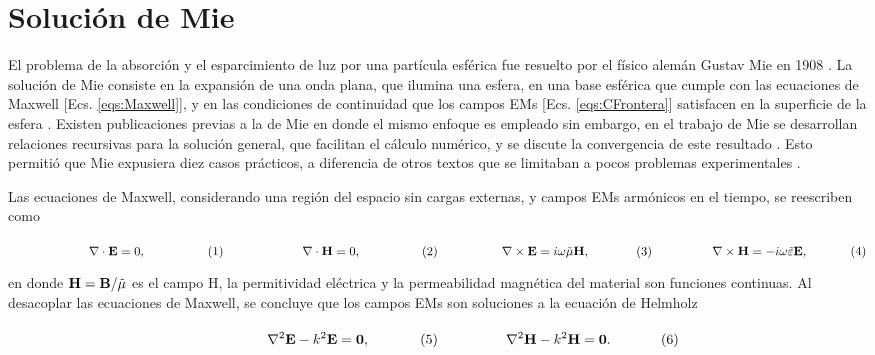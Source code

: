 \section{Solución de Mie}

El problema de la absorción y el esparcimiento de luz por una partícula esférica fue resuelto por el físico alemán Gustav Mie en 1908 \cite{mie1908metallosung}. La solución de Mie consiste en la expansión de una onda plana, que ilumina una esfera, en una base esférica que cumple con las ecuaciones de Maxwell [Ecs. \eqref{eqs:Maxwell}],  y en las condiciones de continuidad que los campos EMs [Ecs. \eqref{eqs:CFrontera}] satisfacen en la superficie de la esfera \cite{bohren1998absorption,mie1908metallosung,horvath2009historic}. Existen publicaciones previas a la de Mie en donde el mismo enfoque es empleado \cite{horvath2009historic} sin embargo, en el trabajo de Mie se  desarrollan relaciones recursivas para la solución general, que facilitan el cálculo numérico, y se discute la convergencia de este resultado \cite{horvath2009historic}. Esto permitió que Mie expusiera diez casos prácticos, a diferencia de otros textos que se limitaban a pocos problemas experimentales \cite{horvath2009historic}.

Las ecuaciones de Maxwell, considerando una región del espacio sin cargas externas, y campos EMs armónicos en el tiempo, se reescriben como

	\begin{subequations}
	\eqhalf{\nabla\cdot \vb{E} = 0, }
	\eqhalf{\nabla\cdot \vb{H} = 0,}
	\eqhalf{\nabla \times \vb{E} = i\omega\tilde{\mu} \vb{H}, \label{seq:FLArm}}
	\eqhalf{\nabla\times\vb{H} = - i \omega\tilde{\varepsilon} \vb{E}, }	
	\label{eqs:MaxwellArm}
	\end{subequations} \vspace*{-1em}
	
\noindent	
en donde $\vb{H} = \vb{B}/\tilde{\mu}$ es el campo H, la permitividad eléctrica y la permeabilidad magnética del material son funciones continuas. Al desacoplar las ecuaciones de Maxwell, se concluye que los campos EMs son soluciones a la ecuación de Helmholz

	\begin{subequations}
	\eqhalf{\nabla^2 \vb{E}- k^2 \vb{E} = \vb{0},}
	\eqhalf{\nabla^2 \vb{H}- k^2 \vb{H} = \vb{0}.}
	\label{eq:Helmholtz}
	\end{subequations} \vspace*{-1em}
	
